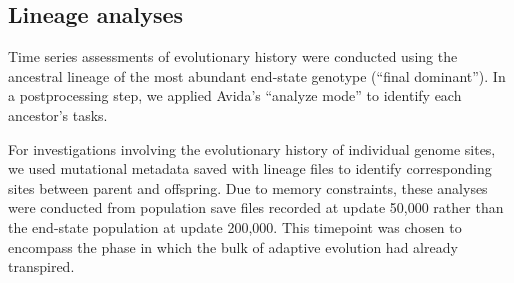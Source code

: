 

\subsection{Lineage analyses}


Time series assessments of evolutionary history were conducted using the ancestral lineage of the most abundant end-state genotype (``final dominant'').
In a postprocessing step, we applied Avida's ``analyze mode'' to identify each ancestor's tasks.

For investigations involving the evolutionary history of individual genome sites, we used mutational metadata saved with lineage files to identify corresponding sites between parent and offspring.
Due to memory constraints, these analyses were conducted from population save files recorded at update 50,000 rather than the end-state population at update 200,000.
This timepoint was chosen to encompass the phase in which the bulk of adaptive evolution had already transpired.

